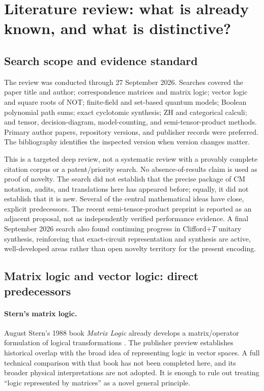 \section{Literature review: what is already known, and what is distinctive?}\label{sec:literature}
\subsection{Search scope and evidence standard}
The review was conducted through 27 September 2026. Searches covered the paper title and author; correspondence matrices and matrix logic; vector logic and square roots of NOT; finite-field and set-based quantum models; Boolean polynomial path sums; exact cyclotomic synthesis; ZH and categorical calculi; and tensor, decision-diagram, model-counting, and semi-tensor-product methods. Primary author papers, repository versions, and publisher records were preferred. The bibliography identifies the inspected version when version changes matter.

This is a targeted deep review, not a systematic review with a provably complete citation corpus or a patent/priority search. No absence-of-results claim is used as proof of novelty. The search did not establish that the precise package of CM notation, audits, and translations here has appeared before; equally, it did not establish that it is new. Several of the central mathematical ideas have close, explicit predecessors. The recent semi-tensor-product preprint is reported as an adjacent proposal, not as independently verified performance evidence.  A final September 2026 search also found continuing progress in Clifford+$T$ unitary synthesis, reinforcing that exact-circuit representation and synthesis are active, well-developed areas rather than open novelty territory for the present encoding.

\subsection{Matrix logic and vector logic: direct predecessors}
\paragraph{Stern's matrix logic.}
August Stern's 1988 book \emph{Matrix Logic} already develops a matrix/operator formulation of logical transformations \cite{stern1988}. The publisher preview establishes historical overlap with the broad idea of representing logic in vector spaces. A full technical comparison with that book has not been completed here, and its broader physical interpretations are not adopted. It is enough to rule out treating ``logic represented by matrices'' as a novel general principle.

